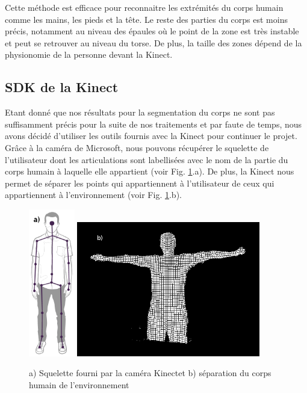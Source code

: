 
Cette méthode est efficace pour reconnaitre les extrémités du corps humain comme les mains, les pieds et la tête. Le reste des parties du corps 
est moins précis, notamment au niveau des épaules où le point de la zone est très instable et peut se retrouver au niveau du torse. De plus, la taille 
des zones dépend de la physionomie de la personne devant la Kinect. 

\subsection{SDK de la Kinect}
Etant donné que nos résultats pour la segmentation du corps ne sont pas suffisamment précis pour la suite de nos traitements et par faute de
temps, nous avons décidé d'utiliser les outils fournis avec la Kinect pour continuer le projet. Grâce à la caméra de Microsoft, nous pouvons
récupérer le squelette de l'utilisateur dont les articulations sont labellisées avec le nom de la partie du corps humain à laquelle elle appartient
(voir Fig. \ref{fig:kinect}.a). De plus, la Kinect nous permet de séparer les points qui appartiennent à l'utilisateur de ceux qui appartiennent
à l'environnement (voir Fig. \ref{fig:kinect}.b).\\

\begin{figure}[!ht]
  \begin{center}
    \includegraphics[width=2cm]{image/kinectSkeleton.png} 
    \includegraphics[width=8cm]{image/seg1.PNG}
    \caption[The LOF caption]{a) Squelette fourni par la caméra Kinect\footnotemark et b) séparation du corps humain de l'environnement}
    \label{fig:kinect}
  \end{center}
\end{figure}

